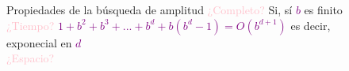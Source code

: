     \begin{frame}{Propiedades de la búsqueda de amplitud}
        \textcolor{Pink}{¿Completo?} Si, sí \textcolor{Purple}{$b$} es finito \\
        \textcolor{Pink}{¿Tiempo?} \textcolor{Purple}{$1+b^2+b^3+...+b^d+b(b^d-1)=O(b^{d+1})$} es decir,\\    \hspace{9.3cm} exponecial en \textcolor{Purple}{$d$} \\
        \textcolor{Pink}{¿Espacio?} \\
    \end{frame}
